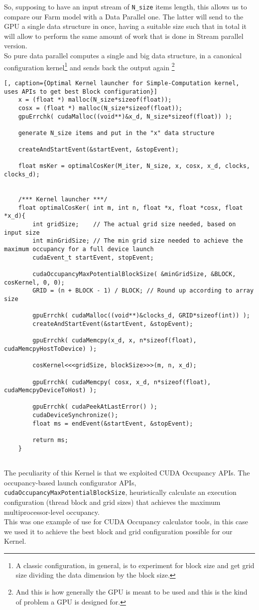 	So, supposing to have an input stream of \texttt{N\_size} items length, this allows us to compare our Farm model with a Data Parallel one. The latter will send to the GPU a single data structure in once, having a suitable size such that in total it will allow to perform the same amount of work that is done in Stream parallel version.\\
	So pure data parallel computes a single and big data structure, in a canonical configuration kernel\footnote{A classic configuration, in general, is to experiment for block size and get grid size dividing the data dimension by the block size.} and sends back the output again \footnote{And this is how generally the GPU is meant to be used and this is the kind of problem a GPU is designed for.}
	\begin{lstlisting}[, caption={Optimal Kernel launcher for Simple-Computation kernel, uses APIs to get best Block configuration}]
	x = (float *) malloc(N_size*sizeof(float));
	cosx = (float *) malloc(N_size*sizeof(float));
	gpuErrchk( cudaMalloc((void**)&x_d, N_size*sizeof(float)) );
	
	generate N_size items and put in the "x" data structure
	
	createAndStartEvent(&startEvent, &stopEvent);
	
	float msKer = optimalCosKer(M_iter, N_size, x, cosx, x_d, clocks, clocks_d); 	
	
	
	/*** Kernel launcher ***/
	float optimalCosKer( int m, int n, float *x, float *cosx, float *x_d){
		int gridSize;    // The actual grid size needed, based on input size 
		int minGridSize; // The min grid size needed to achieve the maximum occupancy for a full device launch 
		cudaEvent_t startEvent, stopEvent;
		
		cudaOccupancyMaxPotentialBlockSize( &minGridSize, &BLOCK, cosKernel, 0, 0); 
		GRID = (n + BLOCK - 1) / BLOCK; // Round up according to array size 

		gpuErrchk( cudaMalloc((void**)&clocks_d, GRID*sizeof(int)) );  		
		createAndStartEvent(&startEvent, &stopEvent); 
		  
		gpuErrchk( cudaMemcpy(x_d, x, n*sizeof(float), cudaMemcpyHostToDevice) ); 
		
		cosKernel<<<gridSize, blockSize>>>(m, n, x_d);
		
		gpuErrchk( cudaMemcpy( cosx, x_d, n*sizeof(float), cudaMemcpyDeviceToHost) );
	
		gpuErrchk( cudaPeekAtLastError() );		
		cudaDeviceSynchronize();		
		float ms = endEvent(&startEvent, &stopEvent);
	
		return ms;	
	}
		
	\end{lstlisting}
	The peculiarity of this Kernel is that we exploited CUDA Occupancy APIs.
	The occupancy-based launch configurator APIs, \texttt{cudaOccupancyMaxPotentialBlockSize}, heuristically calculate an execution configuration (thread block and grid sizes) that achieves the maximum multiprocessor-level occupancy\cite{cudaguide}.\\
	This was one example of use for CUDA Occupancy calculator tools, in this case we used it to achieve the best block and grid configuration possible for our Kernel.
	

